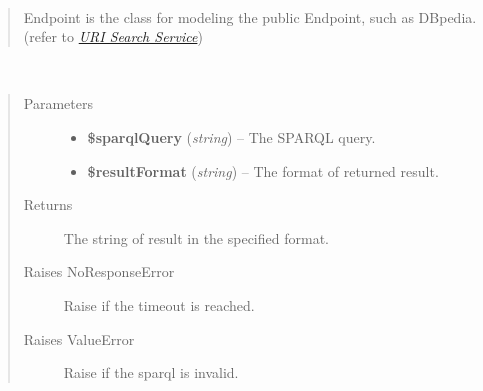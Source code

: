 \documentclass[letterpaper,10pt,english]{sphinxmanual}
\begin{document}
\begin{fulllineitems}
\label{docs/api:Endpoint}~\begin{quote}

Endpoint is the class for modeling the public Endpoint, such as DBpedia. (refer to {\hyperref[docs/uss:uss]{\emph{URI Search Service}}})
\end{quote}

\begin{fulllineitems}
\label{docs/api:Endpoint::issueSparqlQuery}~\begin{quote}\begin{description}
\item[{Parameters}] \leavevmode\begin{itemize}
\item {} 
\textbf{\$sparqlQuery} (\emph{string}) -- The SPARQL query.

\item {} 
\textbf{\$resultFormat} (\emph{string}) -- The format of returned result.

\end{itemize}

\item[{Returns}] \leavevmode
The string of result in the specified format.

\item[{Raises NoResponseError}] \leavevmode
Raise if the timeout is reached.

\item[{Raises ValueError}] \leavevmode
Raise if the sparql is invalid.

\end{description}\end{quote}

\end{fulllineitems}


\end{fulllineitems}

\end{document}
